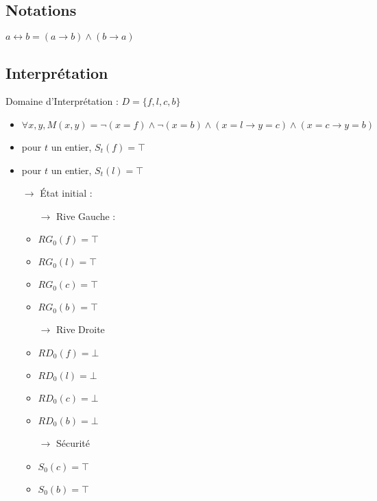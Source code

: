 \documentclass{article}
\begin{document}
\subsection{Notations}
$ a \leftrightarrow b = (a \rightarrow b) \wedge  (b \rightarrow a)$
\subsection{Interprétation}
Domaine d'Interprétation : $D = \{f,l,c,b\}$
\begin{itemize}
  \item $\forall x,y , M(x,y) = \neg(x=f) \wedge \neg(x=b) \wedge (x=l \to y=c) \wedge (x=c \to y=b)$
  \item pour $t$ un entier, $S_t(f) = \top $
  \item pour $t$ un entier, $S_t(l) = \top $
  \item[$ \to $] État initial :
    \begin{itemize}
      \item[$ \to $] Rive Gauche :
      \item $ RG_0(f) = \top $
      \item $ RG_0(l) = \top $
      \item $ RG_0(c) = \top $
      \item $ RG_0(b) = \top $
      \item[$ \to $] Rive Droite
      \item $ RD_0(f) = \bot $
      \item $ RD_0(l) = \bot $
      \item $ RD_0(c) = \bot $
      \item $ RD_0(b) = \bot $
      \item[$ \to $] Sécurité
      \item $ S_0(c) = \top$
      \item $ S_0(b) = \top$
    \end{itemize}

\end{itemize}
\end{document}
